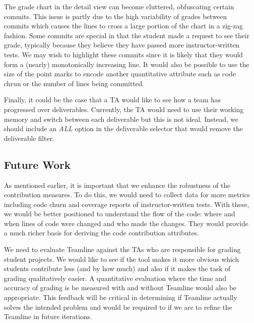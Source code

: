 \documentclass[../manifest.tex]{subfiles}
\begin{document}
The grade chart in the detail view can become cluttered, obfuscating certain commits. This issue is partly due to the high variability of grades between commits which causes the lines to cross a large portion of the chart in a zig-zag fashion. Some commits are special in that the student made a request to see their grade, typically because they believe they have passed more instructor-written tests. We may wish to highlight these commits since it is likely that they would form a (nearly) monotonically increasing line. It would also be possible to use the size of the point marks to encode another quantitative attribute such as code chrun or the number of lines being committed.


Finally, it could be the case that a TA would like to see how a team has progressed over deliverables. Currently, the TA would need to use their working memory and switch between each deliverable but this is not ideal. Instead, we should include an \textit{ALL} option in the deliverable selector that would remove the deliverable filter.


\subsection{Future Work}
As mentioned earlier, it is important that we enhance the robustness of the contribution measures. To do this, we would need to collect data for more metrics including code churn and coverage reports of instructor-written tests. With these, we would be better positioned to understand the flow of the code: where and when lines of code were changed and who made the changes. They would provide a much richer basis for deriving the code contribution attributes.

We need to evaluate Teamline against the TAs who are responsible for grading student projects. We would like to see if the tool makes it more obvious which students contribute less (and by how much) and also if it makes the task of grading qualitatively easier. A quantitative evaluation where the time and accuracy of grading is be measured with and without Teamline would also be appropriate. This feedback will be critical in determining if Teamline actually solves the intended problem and would be required to if we are to refine the Teamline in future iterations.
\end{document}
